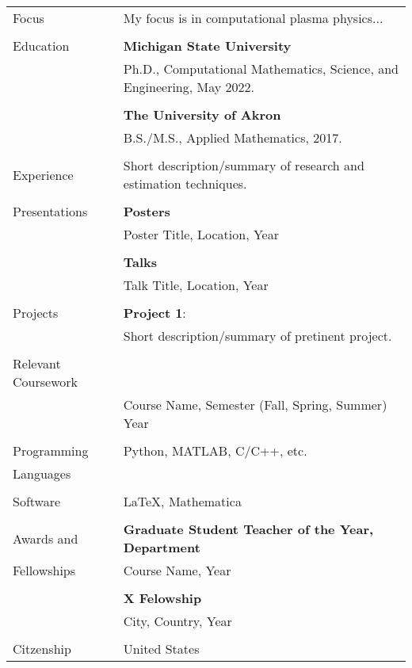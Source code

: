 \noindent \begin{tabular}{@{} l l}

    \Large{Focus} & My focus is in computational plasma physics...\\
    & \\
    \Large{Education}    & \textbf{Michigan State University} \\
    & Ph.D., Computational Mathematics, Science, and Engineering, May 2022. \\
    & \\
    & \textbf{The University of Akron} \\
    & B.S./M.S., Applied Mathematics, 2017. \\
    & \\
    \Large{Experience}    & {\parbox{4.3in}{ \vspace{1.2em} Short description/summary of research and estimation techniques.}}\\
    & \\
    \Large{Presentations}   & \textbf{Posters} \\
    & Poster Title, Location, Year\\
    & \\
    &\textbf{Talks} \\
    & Talk Title, Location, Year\\
    & \\
    \Large{Projects}   & \textbf{Project 1}: \\
    & {\parbox{4.3in}{Short description/summary of pretinent project.}}\\
    & \\
    \Large{Relevant Coursework }    & \\
    & Course Name, Semester (Fall, Spring, Summer) Year \\
    & \\
    \Large{Programming}   & Python, MATLAB, C/C++, etc. \\
    \Large{Languages}& \\
    &\\
    \Large{Software}    & \LaTeX, Mathematica  \\
    &\\
    \Large{Awards and }    & \textbf{Graduate Student Teacher of the Year, Department} \\
    \Large{Fellowships}   & Course Name, Year \\
    & \\
    & \textbf{X Felowship} \\
    & City, Country, Year \\
    & \\
    \Large{Citzenship} & United States

\end{tabular}

%



